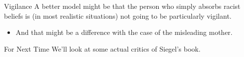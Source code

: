 \documentclass[
  17pt,
  letterpaper,
  ignorenonframetext,
  aspectratio=169,
  xcolor={dvipsnames}]{beamer}
\providecommand{\tightlist}{%
  \setlength{\itemsep}{0pt}\setlength{\parskip}{0pt}}\usepackage{longtable,booktabs,array}
\begin{document}
\begin{frame}{Vigilance}
\protect\hypertarget{vigilance}{}
A better model might be that the person who simply absorbs racist
beliefs is (in most realistic situations) not going to be particularly
vigilant.

\begin{itemize}[<+->]
\tightlist
\item
  And that might be a difference with the case of the misleading mother.
\end{itemize}
\end{frame}

\begin{frame}{For Next Time}
\protect\hypertarget{for-next-time}{}
We'll look at some actual critics of Siegel's book.
\end{frame}
\end{document}
